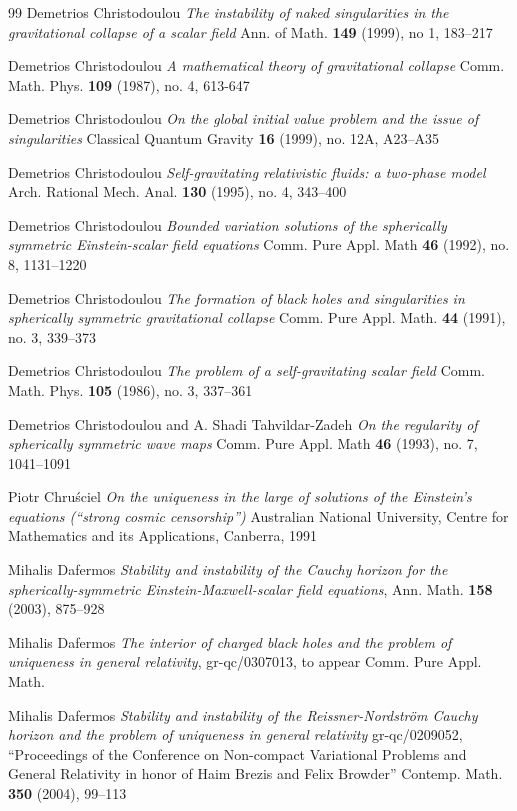 \begin{thebibliography}{99}
 Demetrios Christodoulou \emph{The instability
of naked singularities in the gravitational collapse of
a scalar field} Ann. of Math. {\bf 149} (1999), no 1,
183--217

 Demetrios Christodoulou \emph{A mathematical
theory of gravitational collapse} Comm. Math. Phys.
{\bf 109} (1987), no. 4, 613-647

 Demetrios Christodoulou \emph{On the global
initial value problem and the issue of singularities}
Classical Quantum Gravity {\bf 16} (1999), no. 12A, A23--A35

 Demetrios Christodoulou \emph {Self-gravitating
relativistic fluids: a two-phase model} Arch. Rational Mech. Anal. 
{\bf 130} (1995), no. 4, 343--400

 Demetrios Christodoulou \emph{Bounded variation 
solutions of the spherically symmetric Einstein-scalar field equations}
Comm. Pure Appl. Math {\bf 46} (1992), no. 8, 1131--1220

 Demetrios Christodoulou \emph{The formation
of black holes and singularities in spherically symmetric gravitational
collapse} Comm. Pure Appl. Math. {\bf 44} (1991), no. 3, 339--373

 Demetrios Christodoulou \emph{The problem
of a self-gravitating scalar field} Comm. Math. Phys. {\bf 105}
(1986), no. 3, 337--361

 Demetrios Christodoulou and A. Shadi Tahvildar-Zadeh
\emph{On the regularity of spherically symmetric wave maps} 
Comm. Pure Appl. Math {\bf 46} (1993), no. 7, 1041--1091

 Piotr Chru\'sciel \emph{On the uniqueness in
the large of solutions of the Einstein's equations (``strong
cosmic censorship'')} Australian National
University, Centre for Mathematics and its Applications,
Canberra, 1991

 Mihalis Dafermos \emph{Stability and instability
of the Cauchy horizon for the spherically-symmetric Einstein-Maxwell-scalar
field equations}, Ann. Math. {\bf 158} (2003), 875--928

 Mihalis Dafermos \emph{The interior of
charged black holes and the problem of uniqueness in 
general relativity}, gr-qc/0307013, to appear Comm. Pure Appl. Math.

 Mihalis Dafermos \emph{Stability and instability
of the Reissner-Nordstr\"om Cauchy horizon and the problem of uniqueness
in general relativity} gr-qc/0209052, ``Proceedings
of the Conference on Non-compact Variational Problems and
General Relativity in honor of Haim Brezis and Felix Browder''
Contemp. Math. {\bf 350} (2004), 99--113


\end{thebibliography}
